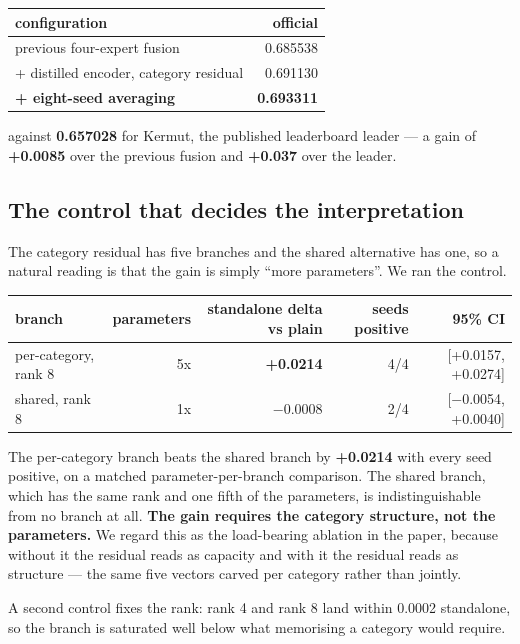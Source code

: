 \documentclass[sigconf,review,nonacm]{acmart}
\begin{document}
\begin{table}[t]
\centering
\small
\begin{tabular}{lr}
\hline
configuration & official \\
\hline
previous four-expert fusion & 0.685538 \\
+ distilled encoder, category residual & 0.691130 \\
\textbf{+ eight-seed averaging} & \textbf{0.693311} \\
\hline
\end{tabular}
\end{table}

against \textbf{0.657028} for Kermut, the published leaderboard leader --- a gain of \textbf{+0.0085} over the
previous fusion and \textbf{+0.037} over the leader.

\subsection{The control that decides the interpretation}\label{the-control-that-decides-the-interpretation}

The category residual has five branches and the shared alternative has one, so a natural reading is that
the gain is simply ``more parameters''. We ran the control.

\begin{table}[t]
\centering
\small
\begin{tabular}{lrrrr}
\hline
branch & parameters & standalone delta vs plain & seeds positive & 95\% CI \\
\hline
per-category, rank 8 & 5x & \textbf{+0.0214} & 4/4 & [+0.0157, +0.0274] \\
shared, rank 8 & 1x & $-$0.0008 & 2/4 & [$-$0.0054, +0.0040] \\
\hline
\end{tabular}
\end{table}

The per-category branch beats the shared branch by \textbf{+0.0214} with every seed positive, on a matched
parameter-per-branch comparison. The shared branch, which has the same rank and one fifth of the
parameters, is indistinguishable from no branch at all. \textbf{The gain requires the category structure, not
the parameters.} We regard this as the load-bearing ablation in the paper, because without it the
residual reads as capacity and with it the residual reads as structure --- the same five vectors carved
per category rather than jointly.

A second control fixes the rank: rank 4 and rank 8 land within 0.0002 standalone, so the branch is
saturated well below what memorising a category would require.
\end{document}

